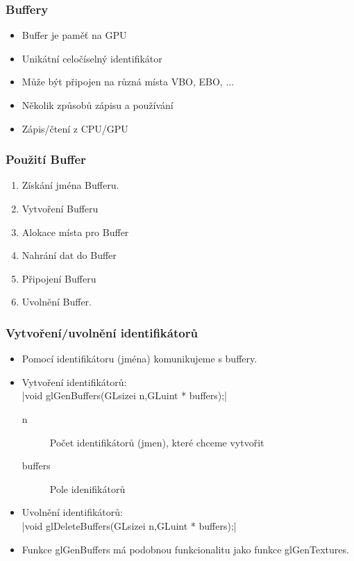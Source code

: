 \begin{frame}

\frametitle{Buffery}
	\begin{itemize}
		\item Buffer je paměť na GPU
		\item Unikátní celočíselný identifikátor
		\item Může být připojen na různá místa VBO, EBO, ...
		\item Několik způsobů zápisu a používání
		\item Zápis/čtení z CPU/GPU
	\end{itemize}
\end{frame}


\begin{frame}
\frametitle{Použití Buffer}
    \begin{enumerate}
        \item{Získání jména Bufferu.}
				\item{Vytvoření Bufferu}
				\item{Alokace místa pro Buffer}
				\item{Nahrání dat do Buffer}
				\item{Připojení Bufferu}
				\item{Uvolnění Buffer.}
    \end{enumerate}
\end{frame}


\begin{frame}[fragile]

\frametitle{Vytvoření/uvolnění identifikátorů}
	\begin{itemize}
		\item{Pomocí identifikátoru (jména) komunikujeme s buffery.}
		\item{
		Vytvoření identifikátorů:\\
		{\scriptsize
		|void glGenBuffers(GLsizei n,GLuint * buffers);|
		}
		\begin{description}
			\item[n] Počet identifikátorů (jmen), které chceme vytvořit
			\item[buffers] Pole idenifikátorů
		\end{description}
		}

		\item{
		Uvolnění identifikátorů:\\
		{\scriptsize
		|void glDeleteBuffers(GLsizei n,GLuint * buffers);|
		}}

		\item{
		Funkce {\color{blue}glGenBuffers} má podobnou funkcionalitu jako funkce {\color{blue}glGenTextures}.
		}
	\end{itemize}
\end{frame}

